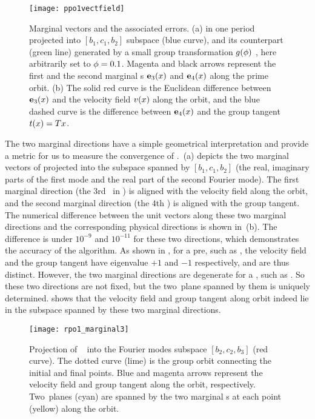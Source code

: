 \begin{figure}[h]
  \centering
  \texttt{[image: ppo1vectfield]}
  \caption[The accuracy of the two marginal vectors of .]{
    Marginal vectors and the associated errors.
    (a)  in one period projected into
    {$[b_1, c_{1}, b_{2}]$}
    subspace (blue curve), and its counterpart (green line) generated by
    a small group transformation $\LieEl(\gSpace)$
    , here arbitrarily set to $\gSpace= 0.1$. Magenta and black
    arrows represent the first and the second marginal \Fv s
    $\jEigvec[3](x)$ and $\jEigvec[4](x)$ along the prime orbit.
    (b) The solid red curve is the {Euclidean} difference between
    $\jEigvec[3](x)$ and the velocity field $\vel(x)$ along the orbit,
    and the blue dashed curve is the difference between $\jEigvec[4](x)$ and
    the group tangent $t(x)=\Lg x$.
  }
  \label{fig:ppo1vectorfield}
\end{figure}

The two marginal directions have a simple geometrical interpretation and provide
a metric for us to measure the convergence of \ped.
\,(a) depicts the two marginal vectors of
 projected into the subspace spanned
by {$[b_1, c_{1}, b_{2}]$}
(the real, imaginary parts of the first mode and the real part of the
second Fourier mode). The first marginal {direction} (the $3$rd
\Fv\ in  ) is aligned with the velocity
field along the orbit, and the second marginal direction (the $4$th
\Fv ) is aligned with the group tangent. The numerical
difference between the unit vectors along these two marginal directions
and the corresponding physical directions is shown in
\,(b). The difference is under $10^{-9}$ and
$10^{-11}$ for these two directions, which demonstrates the accuracy of
the algorithm.
As shown in , for a pre\po, such as ,
the {velocity field} and the group tangent have eigenvalue $+1$ and
$-1$ respectively, and are thus distinct. However, the two marginal
directions are degenerate for a \rpo, such as . So these two
directions are not fixed, but the
two\dmn\ plane spanned by them is uniquely
determined.  shows that the velocity field and
group tangent along orbit  indeed lie in the subspace spanned
by these two marginal directions.

\begin{figure}[h]
  \centering
  \texttt{[image: rpo1\_marginal3]}
  \caption[The plane spanned by the two marginal vectors of .]{
    Projection of \rpo\  into
    the Fourier modes
    subspace $[b_2,c_2,b_3]$ (red curve). The dotted
    curve (lime) is the group orbit
    connecting the initial and final points. Blue and magenta arrows
    represent the velocity field and group tangent along the orbit,
    respectively. Two\dmn\ planes (cyan) are spanned by the
    two marginal \Fv s at each point (yellow) along the orbit.
  }
  \label{fig:rpo1_marginal3}
\end{figure}

